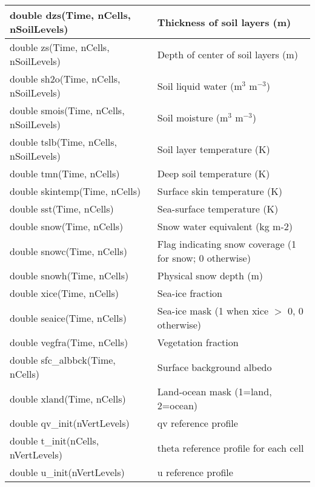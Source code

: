 {\begin{longtable}{|p{2.5in} |p{3.75in}|}
        double dzs(Time, nCells, nSoilLevels)       & Thickness of soil layers (m) \\ \hline
        double zs(Time, nCells, nSoilLevels)        & Depth of center of soil layers (m) \\ \hline
        double \hfil\break sh2o(Time, nCells, nSoilLevels)      & Soil liquid water (m$^{3}$ m$^{-3}$) \\ \hline
        double \hfil\break smois(Time, nCells, nSoilLevels)     & Soil moisture (m$^{3}$ m$^{-3}$) \\ \hline
        double tslb(Time, nCells, nSoilLevels)      & Soil layer temperature (K) \\ \hline
        double tmn(Time, nCells)                    & Deep soil temperature (K) \\ \hline
        double skintemp(Time, nCells)               & Surface skin temperature (K) \\ \hline
        double sst(Time, nCells)                    & Sea-surface temperature (K) \\ \hline
        double snow(Time, nCells)                   & Snow water equivalent (kg m-2) \\ \hline
        double snowc(Time, nCells)                  & Flag indicating snow coverage (1 for snow; 0 otherwise) \\ \hline
        double snowh(Time, nCells)                  & Physical snow depth (m) \\ \hline
        double xice(Time, nCells)                   & Sea-ice fraction \\ \hline
        double seaice(Time, nCells)                 & Sea-ice mask (1 when xice $>$ 0, 0 otherwise) \\ \hline
        double vegfra(Time, nCells)                 & Vegetation fraction \\ \hline
        double sfc\_albbck(Time, nCells)            &  Surface background albedo \\ \hline
        double xland(Time, nCells)                  & Land-ocean mask (1=land, 2=ocean) \\ \hline
        double qv\_init(nVertLevels)           &               qv reference profile \\ \hline
        double t\_init(nCells, nVertLevels)    &               theta reference profile for each cell \\ \hline
        double u\_init(nVertLevels)            &               u reference profile \\ \hline

\end{longtable}}
